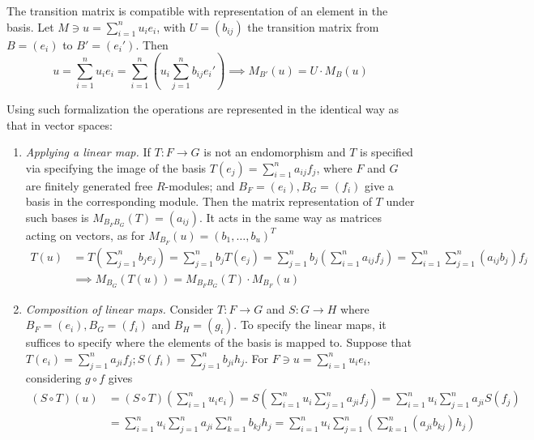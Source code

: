 \documentclass{article}
\begin{document}
\begin{remark}
    The transition matrix is compatible with representation of an element in the basis. Let $M \ni u = \sum_{i=1}^n u_i e_i$, with $U = (b_{ij})$ the transition matrix from $B = (e_i)$ to $B' = (e_i')$. Then 
    \[
        u = \sum\limits_{i = 1}^n u_i e_i = \sum\limits_{i=1}^n \left(u_i \sum\limits_{j=1}^n b_{ij} e_i'\right) \implies M_{B'}(u) = U\cdot M_{B}(u)
    \]
\end{remark}

\begin{remark}
    Using such formalization the operations are represented in the identical way as that in vector spaces:
    \begin{enumerate}
        \item \emph{Applying a linear map.} If $T: F\to G$ is not an endomorphism and $T$ is specified via specifying the image of the basis $T(e_j) = \sum_{i=1}^n a_{ij} f_j$, where $F$ and $G$ are finitely generated free $R$-modules; and $B_F = (e_i), B_G = (f_i)$ give a basis in the corresponding module. Then the matrix representation of $T$ under such bases is $M_{B_F B_G}(T) = (a_{ij})$. It acts in the same way as matrices acting on vectors, as for $M_{B_F}(u) = (b_1, \ldots, b_u)^T$
        \begin{align*}
            T(u) & = T\left( \sum_{j=1}^n b_j e_j \right) = \sum_{j=1}^n b_j T\left( e_j \right) = \sum_{j=1}^n b_j \left( \sum_{i=1}^n a_{ij} f_j \right) = \sum_{i=1}^n \sum_{j=1}^n (a_{ij} b_j) f_j \\
            & \implies M_{B_G}(T(u)) = M_{B_F B_G}(T) \cdot M_{B_F}(u) \qquad \qquad \qquad \qquad \qquad \quad
        \end{align*}
        \item \emph{Composition of linear maps.} Consider $T: F \to G$ and $S: G \to H$ where $B_F = (e_i), B_G = (f_i)$ and $B_H = (g_i)$. To specify the linear maps, it suffices to specify where the elements of the basis is mapped to. Suppose that $T(e_i) = \sum_{j=1}^n a_{ji} f_j; S(f_i) = \sum_{j=1}^n b_{ji} h_j$. For $F \ni u = \sum_{i=1}^n u_i e_i$, considering $g \circ f$ gives
        \begin{align*}
            (S\circ T)(u)
            & = (S\circ T)\left( \sum_{i=1}^n u_i e_i \right) = S\left( \sum_{i=1}^n u_i \sum_{j=1}^n a_{ji} f_j \right) = \sum_{i=1}^{n} u_i \sum_{j=1}^{n} a_{ji} S(f_j) \\
            & = \sum_{i=1}^{n} u_i \sum_{j=1}^{n} a_{ji} \sum_{k=1}^n b_{kj} h_j = \sum_{i=1}^n u_i \sum_{j=1}^{n} \left(\sum_{k=1}^{n} (a_{ji}b_{kj}) h_j\right) \\

\end{align*}
\end{enumerate}
\end{remark}
\end{document}
